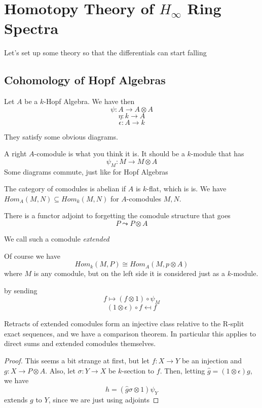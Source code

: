\section{Homotopy Theory of $H_\infty$ Ring Spectra}

Let's set up some theory so that the differentials can start falling

\subsection{Cohomology of Hopf Algebras}

Let $A$ be a $k$-Hopf Algebra.  We have then
\[\psi:A\to A\otimes A\]
\[\eta:k\to A\]
\[\epsilon:A\to k\]

They satisfy some obvious diagrams.  

\begin{Def}
  A right $A$-comodule is what you think it is.  It should be a $k$-module that has
  \[\psi_M:M\to M\otimes A\]
  Some diagrams commute, just like for Hopf Algebras
\end{Def}

The category of comodules is abelian if $A$ is $k$-flat, which is is.  
We have $Hom_A(M,N)\subseteq Hom_k(M,N)$ for $A$-comodules $M,N$.  

There is a functor adjoint to forgetting the comodule structure that goes
\[P\leadsto P\otimes A\]
\begin{Def}
  We call such a comodule \emph{extended}
\end{Def}



Of course we have
\[Hom_k(M,P)\cong Hom_A(M,p\otimes A)\]
where $M$ is any comodule, but on the left side it is considered just as a $k$-module.

by sending
\[f\mapsto (f\otimes1)\circ \psi_M\]
\[(1\otimes\epsilon)\circ f \mapsfrom f\]

\begin{Lemma}
  Retracts of extended comodules form an injective class relative to the R-split exact sequences, and we have a comparison theorem.
  In particular this applies to direct sums and extended comodules themselves.  
\end{Lemma}

\begin{proof}
  This seems a bit strange at first, but let $f:X\to Y$ be an injection and $g:X\to P\otimes A$.  
  Also, let $\sigma:Y\to X$ be $k$-section to $f$.  Then, letting $\hat{g}=(1\otimes \epsilon)g$, we have
  \[h=(\hat{g}\sigma\otimes 1)\psi_Y\]
  extends $g$ to $Y$, since we are just using adjoints
\end{proof}


